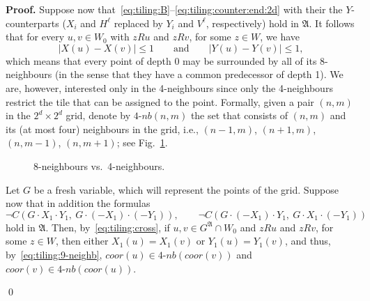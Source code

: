 \documentclass{LMCS}
\renewenvironment{proof}{\par\noindent\textbf{Proof.}}{\mbox{}\qed\par\medskip}
\theoremstyle{plain}
\newcommand{\coor}[1]{\textit{coor}(#1)}\newcommand{\neighb}[1]{\textit{4-nb}(#1)}
\begin{document}
\begin{proof}
Suppose now that~\eqref{eq:tiling:B}--\eqref{eq:tiling:counter:end:2d} with their the $Y$-counterparts ($X_i$ and $H^\ell$ replaced by $Y_i$ and $V^\ell$, respectively)
hold in $\mathfrak{A}$. It
follows that for every $u,v\in W_0$ with $zRu$ and $zRv$, for some $z\in W$, we have
\begin{equation}\label{eq:tiling:9-neighb}
|X(u) - X(v)|\leq 1 \qquad\text{and}\qquad |Y(u) - Y(v)|\leq 1,
\end{equation}
which means that every point of depth 0 may be surrounded
by all of its 8-neighbours (in the sense that they have a common predecessor of depth 1). We are, however, interested only in the 4-neighbours since only the 4-neighbours restrict the tile that can be assigned to the point. Formally, given a pair $(n,m)$ in the $2^d\times 2^d$ grid, denote by $\neighb{n,m}$ the set that
consists of $(n,m)$ and its (at most four) neighbours in the grid, i.e., $(n-1,m)$, $(n+1,m)$, $(n,m-1)$, $(n,m+1)$; see Fig.~\ref{fig:neighbours}.
\begin{figure}[t]
\setlength{\unitlength}{0.7mm}
\caption{8-neighbours vs.\ 4-neighbours.}\label{fig:neighbours}
\end{figure}
Let $G$ be a fresh variable, which will represent the points of the grid. Suppose now that in addition the
formulas\begin{equation}\label{eq:tiling:cross}
\neg C(G \cdot X_1 \cdot Y_1, \ G \cdot (-X_1) \cdot (-Y_1)),\qquad \neg C(G \cdot (-X_1) \cdot Y_1, \ G \cdot X_1 \cdot (-Y_1))
\end{equation}
hold in $\mathfrak{A}$. Then, by~\eqref{eq:tiling:cross},
if $u,v\in G^\mathfrak{A}\cap W_0$ and $zRu$ and $zRv$, for some $z\in
W$, then either $X_1(u) = X_1(v)$ or $Y_1(u) = Y_1(v)$, and thus, by~\eqref{eq:tiling:9-neighb}, $\coor{u} \in \neighb{\coor{v}}$ and $\coor{v} \in \neighb{\coor{u}}$.


\end{proof}
\end{document}
